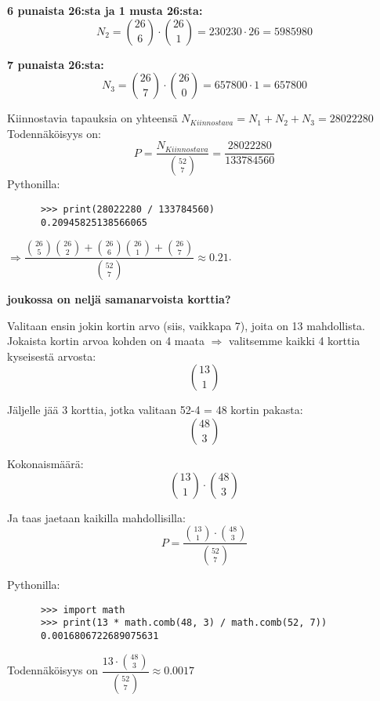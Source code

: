 \documentclass[12pt,a4paper]{article}
\begin{document}
\begin{kohta}
\begin{alakohta}
    \item \textbf{6 punaista 26:sta ja 1 musta 26:sta:} \\
    \[ N_2 = \binom{26}{6} \cdot \binom{26}{1} = 230230 \cdot 26 = 5985980 \]

    \item \textbf{7 punaista 26:sta:} \\
    \[ N_3 = \binom{26}{7} \cdot \binom{26}{0} = 657800 \cdot 1 = 657800 \]
\end{alakohta}
Kiinnostavia tapauksia on yhteensä $N_{Kiinnostava} = N_1 + N_2 + N_3 = 28022280$\\

Todennäköisyys on:
\[
P = \frac{N_{Kiinnostava}}{\binom{52}{7}} = \frac{28022280}{133784560}
\]
  Pythonilla:
    \begin{verbatim}
      >>> print(28022280 / 133784560)
      0.20945825138566065
    \end{verbatim}

$\Rightarrow  \dfrac{\binom{26}{5}\binom{26}{2} + \binom{26}{6}\binom{26}{1} + \binom{26}{7}}{\binom{52}{7}} \approx 0.21$.






\pagebreak
  \item \textbf{joukossa on neljä samanarvoista korttia?}

  Valitaan ensin jokin kortin arvo (siis, vaikkapa 7), joita on 13 mahdollista.
  Jokaista kortin arvoa kohden on 4 maata $\Rightarrow $ valitsemme kaikki 4 korttia kyseisestä arvosta:
  \[
  \binom{13}{1}
  \]

  Jäljelle jää 3 korttia, jotka valitaan 52-4 = 48 kortin pakasta:
  \[
  \binom{48}{3}
  \]

  Kokonaismäärä:
  \[
  \binom{13}{1} \cdot \binom{48}{3}
  \]

  Ja taas jaetaan kaikilla mahdollisilla:
  \[
  P = \frac{\binom{13}{1} \cdot \binom{48}{3}}{\binom{52}{7}}
  \]

    Pythonilla:
    \begin{verbatim}
      >>> import math
      >>> print(13 * math.comb(48, 3) / math.comb(52, 7))
      0.0016806722689075631
    \end{verbatim}



  Todennäköisyys on \(\dfrac{13 \cdot \binom{48}{3}}{\binom{52}{7}} \approx 0.0017\)
\end{kohta}
\end{document}

